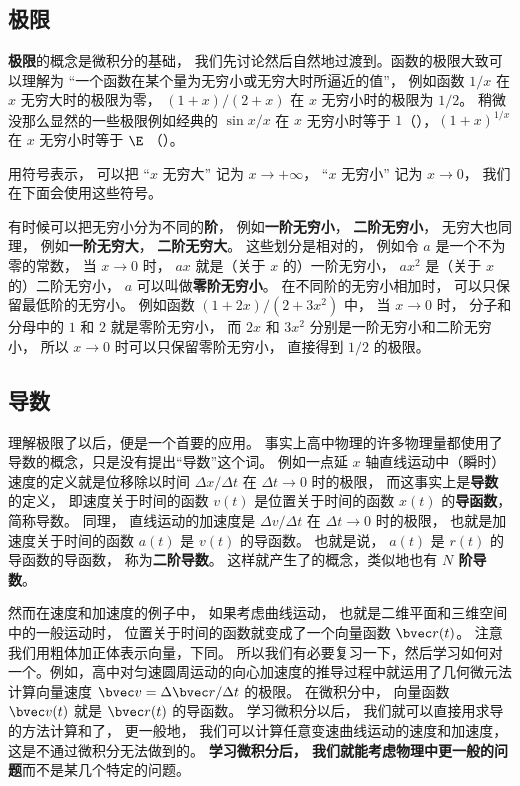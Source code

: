 \subsection{极限}
\textbf{极限}的概念是微积分的基础， 我们先讨论然后自然地过渡到。函数的极限大致可以理解为 “一个函数在某个量为无穷小或无穷大时所逼近的值”， 例如函数 $1/x$ 在 $x$ 无穷大时的极限为零， $(1+x)/(2+x)$ 在 $x$ 无穷小时的极限为 $1/2$。 稍微没那么显然的一些极限例如经典的 $\sin x/ x$ 在 $x$ 无穷小时等于 $1$（），$(1+x)^{1/x}$ 在 $x$ 无穷小时等于 $\E$ （）。

用符号表示， 可以把 “$x$ 无穷大” 记为 $x \to +\infty$， “$x$ 无穷小” 记为 $x \to 0$， 我们在下面会使用这些符号。

有时候可以把无穷小分为不同的\textbf{阶}， 例如\textbf{一阶无穷小}， \textbf{二阶无穷小}， 无穷大也同理， 例如\textbf{一阶无穷大}， \textbf{二阶无穷大}。 这些划分是相对的， 例如令 $a$ 是一个不为零的常数， 当 $x \to 0$ 时， $a x$ 就是（关于 $x$ 的）一阶无穷小， $a x^2$ 是（关于 $x$ 的）二阶无穷小， $a$ 可以叫做\textbf{零阶无穷小}。 在不同阶的无穷小相加时， 可以只保留最低阶的无穷小。 例如函数 $(1+2x)/(2+3x^2)$ 中， 当 $x\to 0$ 时， 分子和分母中的 $1$ 和 $2$ 就是零阶无穷小， 而 $2x$ 和 $3x^2$ 分别是一阶无穷小和二阶无穷小， 所以 $x\to 0$ 时可以只保留零阶无穷小， 直接得到 $1/2$ 的极限。

\subsection{导数}
理解极限了以后，便是一个首要的应用。 事实上高中物理的许多物理量都使用了导数的概念，只是没有提出“导数”这个词。 例如一点延 $x$ 轴直线运动中（瞬时）速度的定义就是位移除以时间 $\Delta x/\Delta t$ 在 $\Delta t \to 0$ 时的极限， 而这事实上是\textbf{导数}的定义， 即速度关于时间的函数 $v(t)$ 是位置关于时间的函数 $x(t)$ 的\textbf{导函数}， 简称导数。 同理， 直线运动的加速度是 $\Delta v/\Delta t$ 在 $\Delta t \to 0$ 时的极限， 也就是加速度关于时间的函数 $a(t)$ 是 $v(t)$ 的导函数。 也就是说， $a(t)$ 是 $r(t)$ 的导函数的导函数， 称为\textbf{二阶导数}。 这样就产生了的概念，类似地也有 \textbf{$N$ 阶导数}。

然而在速度和加速度的例子中， 如果考虑曲线运动， 也就是二维平面和三维空间中的一般运动时， 位置关于时间的函数就变成了一个向量函数 $\bvec r(t)$。 注意我们用粗体加正体表示向量，下同。 所以我们有必要复习一下，然后学习如何对一个。例如，高中对匀速圆周运动的向心加速度的推导过程中就运用了几何微元法计算向量速度 $\bvec v = \Delta \bvec r/\Delta t$ 的极限。 在微积分中， 向量函数 $\bvec v(t)$ 就是 $\bvec r(t)$ 的导函数。 学习微积分以后， 我们就可以直接用求导的方法计算和了， 更一般地， 我们可以计算任意变速曲线运动的速度和加速度， 这是不通过微积分无法做到的。 \textbf{学习微积分后， 我们就能考虑物理中更一般的问题}而不是某几个特定的问题。

